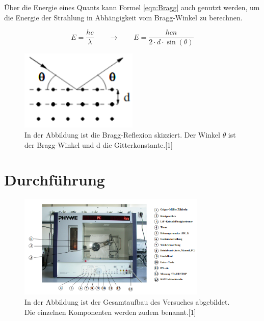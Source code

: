\documentclass[titlepage = firstcover]{scrartcl}
\begin{document}
            \noindent
            Über die Energie eines Quants kann Formel \ref{eqn:Bragg} auch genutzt werden, um die Energie der Strahlung in Abhängigkeit vom Bragg-Winkel zu berechnen.
            
            \begin{equation}
              E = \frac{hc}{\lambda} \qquad \longrightarrow \qquad E = \frac{hcn}{2\cdot d \cdot \sin(\theta)}
              \label{eqn:Energie}
            \end{equation}

            \FloatBarrier

            \begin{figure}[h]
              \centering
              \includegraphics[width = 0.5\textwidth]{skizzebragg.png}
              \caption{In der Abbildung ist die Bragg-Reflexion skizziert. Der Winkel $\theta$ ist der Bragg-Winkel und d die Gitterkonstante.[1]}
              \label{fig:SkizzeBragg}
            \end{figure}

            \FloatBarrier

    \newpage
    \section{Durchführung}

    \FloatBarrier

    \begin{figure}[h]
      \centering
      \includegraphics[width = 0.8\textwidth]{Aufbau.png}
      \caption{In der Abbildung ist der Gesamtaufbau des Versuches abgebildet. Die einzelnen Komponenten werden zudem benannt.[1]}
      \label{fig:Aufbau}
    \end{figure}
\end{document}

